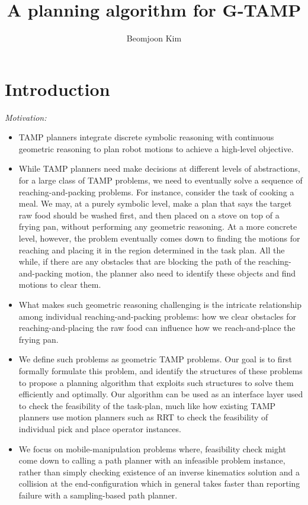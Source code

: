 \documentclass[10pt,letterpaper]{article}
\author{Beomjoon Kim}
\title{A planning algorithm for G-TAMP}
\begin{document}
\maketitle
\section{Introduction}
\emph{Motivation:}
\begin{itemize}
\item TAMP planners integrate discrete symbolic reasoning with continuous
geometric reasoning to plan robot motions to achieve a high-level objective.
\item While TAMP planners need make decisions at different levels of abstractions,
for a large class of TAMP problems, we need to
eventually solve a sequence of reaching-and-packing problems. For instance, consider
the task of cooking a meal. We may, at
a purely symbolic level, make a plan that says the target raw food
should be washed first, and then placed on a stove on top of a frying pan, without
performing any geometric reasoning. At a more concrete level, however,
the problem eventually comes down to finding the motions for reaching and
placing it in the region determined
in the task plan. All the while, if there are any obstacles that are
blocking the path of the reaching-and-packing motion, the planner also need
to identify these objects and find motions to clear them. 
\item What makes such geometric reasoning challenging is the intricate
relationship among individual reaching-and-packing problems: how we clear
obstacles for reaching-and-placing the raw food can influence how we
reach-and-place the frying pan.
\item We define such problems as geometric TAMP problems. Our goal is to
first formally formulate this problem, and identify the structures of these problems
to propose a planning algorithm that exploits such structures to solve them
efficiently and optimally. Our algorithm can be used as an interface layer  used
to check the feasibility of the task-plan, much like how existing
TAMP planners use motion planners such as RRT to check the 
feasibility of individual pick and place operator
instances.
\item We focus on mobile-manipulation problems where, feasibility check
might come down to calling a path planner with an infeasible problem instance,
rather than simply checking existence of an inverse kinematics solution
and a collision at the end-configuration which in general takes
faster than reporting failure with a sampling-based path planner.
\end{itemize}
\end{document}
